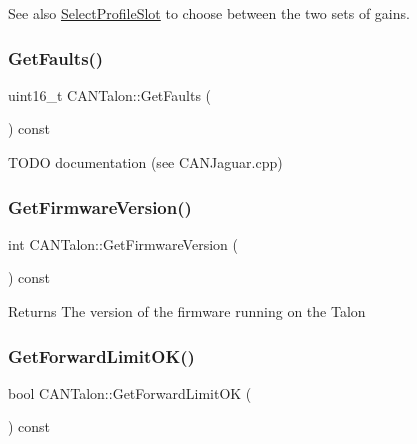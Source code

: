 \begin{DoxySeeAlso}{See also}
\hyperlink{class_c_a_n_talon_a0f478462884ed5e541179821c44b724f}{Select\+Profile\+Slot} to choose between the two sets of gains. 
\end{DoxySeeAlso}
\mbox{\label{class_c_a_n_talon_aeee8ab02812ca4f4fac0baefff57bfbc}} 
\subsubsection{\texorpdfstring{Get\+Faults()}{GetFaults()}}
{\footnotesize\ttfamily uint16\+\_\+t C\+A\+N\+Talon\+::\+Get\+Faults (\begin{DoxyParamCaption}{ }\end{DoxyParamCaption}) const\hspace{0.3cm}{\ttfamily [override]}}

T\+O\+DO documentation (see C\+A\+N\+Jaguar.\+cpp) \mbox{\label{class_c_a_n_talon_a16f7d01201fe09094a76fdd192307b2a}} 
\subsubsection{\texorpdfstring{Get\+Firmware\+Version()}{GetFirmwareVersion()}}
{\footnotesize\ttfamily int C\+A\+N\+Talon\+::\+Get\+Firmware\+Version (\begin{DoxyParamCaption}{ }\end{DoxyParamCaption}) const\hspace{0.3cm}{\ttfamily [override]}}

\begin{DoxyReturn}{Returns}
The version of the firmware running on the Talon 
\end{DoxyReturn}
\mbox{\label{class_c_a_n_talon_af9f50de12a090b0b70edb2dc57e48f61}} 
\subsubsection{\texorpdfstring{Get\+Forward\+Limit\+O\+K()}{GetForwardLimitOK()}}
{\footnotesize\ttfamily bool C\+A\+N\+Talon\+::\+Get\+Forward\+Limit\+OK (\begin{DoxyParamCaption}{ }\end{DoxyParamCaption}) const\hspace{0.3cm}{\ttfamily [override]}}

